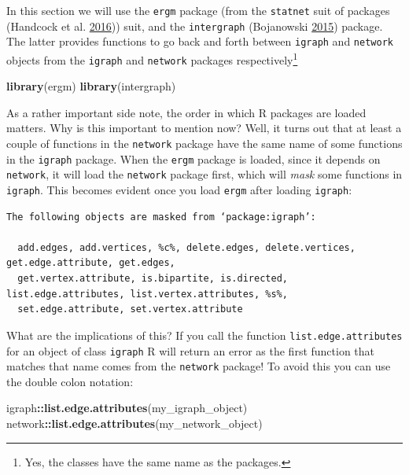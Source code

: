 \documentclass[]{book}
\newenvironment{Shaded}{\begin{snugshade}}{\end{snugshade}}
\newcommand{\KeywordTok}[1]{\textcolor[rgb]{0.13,0.29,0.53}{\textbf{#1}}}
\newcommand{\NormalTok}[1]{#1}
\newcommand{\OperatorTok}[1]{\textcolor[rgb]{0.81,0.36,0.00}{\textbf{#1}}}
\begin{document}
In this section we will use the \texttt{ergm} package (from the \texttt{statnet} suit of packages (Handcock et al. \protect\hyperlink{ref-R-statnet}{2016})) suit, and the \texttt{intergraph} (Bojanowski \protect\hyperlink{ref-R-intergraph}{2015}) package. The latter provides functions to go back and forth between \texttt{igraph} and \texttt{network} objects from the \texttt{igraph} and \texttt{network} packages respectively\footnote{Yes, the classes have the same name as the packages.}

\begin{Shaded}
\begin{Highlighting}[]
\KeywordTok{library}\NormalTok{(ergm)}
\KeywordTok{library}\NormalTok{(intergraph)}
\end{Highlighting}
\end{Shaded}

As a rather important side note, the order in which R packages are loaded matters. Why is this important to mention now? Well, it turns out that at least a couple of functions in the \texttt{network} package have the same name of some functions in the \texttt{igraph} package. When the \texttt{ergm} package is loaded, since it depends on \texttt{network}, it will load the \texttt{network} package first, which will \emph{mask} some functions in \texttt{igraph}. This becomes evident once you load \texttt{ergm} after loading \texttt{igraph}:

\begin{verbatim}
The following objects are masked from ‘package:igraph’:

  add.edges, add.vertices, %c%, delete.edges, delete.vertices, get.edge.attribute, get.edges,
  get.vertex.attribute, is.bipartite, is.directed, list.edge.attributes, list.vertex.attributes, %s%,
  set.edge.attribute, set.vertex.attribute
\end{verbatim}

What are the implications of this? If you call the function \texttt{list.edge.attributes} for an object of class \texttt{igraph} R will return an error as the first function that matches that name comes from the \texttt{network} package! To avoid this you can use the double colon notation:

\begin{Shaded}
\begin{Highlighting}[]
\NormalTok{igraph}\OperatorTok{::}\KeywordTok{list.edge.attributes}\NormalTok{(my_igraph_object)}
\NormalTok{network}\OperatorTok{::}\KeywordTok{list.edge.attributes}\NormalTok{(my_network_object)}
\end{Highlighting}
\end{Shaded}
\end{document}
